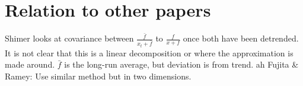 \section{Relation to other papers}
Shimer looks at covariance between $\frac{\bar{f}}{x_t+\bar{f}}$ to $\frac{f}{x+f}$ once both have been detrended. It is not clear that this is a linear decomposition or where the approximation is made around. $\bar{f}$ is the long-run average, but deviation is from trend.
ah
Fujita \& Ramey: Use similar method but in two dimensions.
